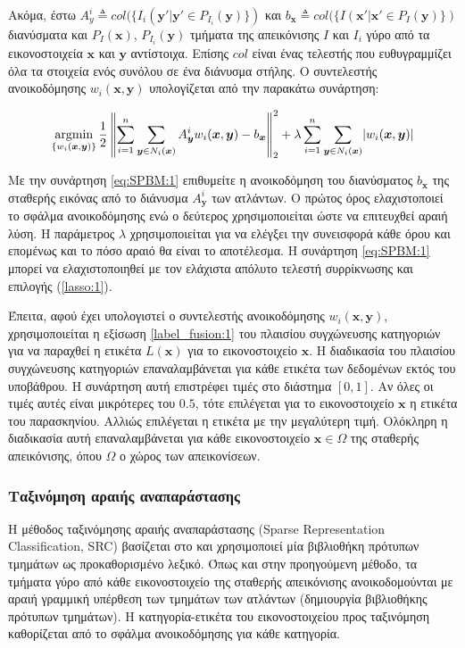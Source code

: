 \documentclass[a4paper,12pt]{article}
\newcommand{\argminB}{\mathop{\mathrm{argmin}}}
\DeclarePairedDelimiter\abs{\lvert}{\rvert}
\newcommand\norm[1]{\left\lVert#1\right\rVert}
\begin{document}
Ακόμα, έστω $A^i_y \triangleq col(\{I_i(\bm{y'} | \bm{y'} \in
P_{I_i}(\bm{y})\})$ και $b_{\bm{x}} \triangleq col( \{ I(\bm{x'} | \bm{x'} \in
P_{I}(\bm{y})\})$ διανύσματα και $P_{I}(\bm{x})$, $P_{I_i}(\bm{y})$ τμήματα της
απεικόνισης $I$ και $I_i$ γύρο από τα εικονοστοιχεία $\bm{x}$ και $\bm{y}$
αντίστοιχα. Επίσης $col$ είναι ένας τελεστής που ευθυγραμμίζει όλα τα στοιχεία
ενός συνόλου σε ένα διάνυσμα στήλης. Ο συντελεστής ανοικοδόμησης
$w_i(\bm{x},\bm{y})$ υπολογίζεται από την παρακάτω συνάρτηση:

\begin{equation} \label{eq:SPBM:1}
    \argminB_{\{w_i(\bm{x},\bm{y})\}} { \frac{1} {2} \norm {\sum_{i=1}^{n}
    \sum_{\bm{y} \in N_i(\bm{x})} A_{\bm{y}}^i w_i(\bm{x},\bm{y}) -
    b_{\bm{x}}}_2^2 }
    + \lambda \sum_{i=1}^{n} \sum_{\bm{y} \in N_i(\bm{x})}
    \abs{w_i(\bm{x},\bm{y})}
\end{equation}

Με την συνάρτηση \eqref{eq:SPBM:1} επιθυμείτε η ανοικοδόμηση του διανύσματος
$b_{\bm{x}}$ της σταθερής εικόνας από το διάνυσμα $A^i_{\bm{y}}$ των ατλάντων. Ο
πρώτος όρος ελαχιστοποιεί το σφάλμα ανοικοδόμησης ενώ ο δεύτερος χρησιμοποιείται
ώστε να επιτευχθεί αραιή λύση. Η παράμετρος $\lambda$ χρησιμοποιείται για να
ελέγξει την συνεισφορά κάθε όρου και επομένως και το πόσο αραιό θα είναι το
αποτέλεσμα. Η συνάρτηση \eqref{eq:SPBM:1} μπορεί να ελαχιστοποιηθεί με τον
ελάχιστα απόλυτο τελεστή συρρίκνωσης και επιλογής (\ref{lasso:1}).

Έπειτα, αφού έχει υπολογιστεί ο συντελεστής ανοικοδόμησης $w_i(\bm{x},\bm{y})$, 
χρησιμοποιείται η εξίσωση \eqref{label_fusion:1} του πλαισίου συγχώνευσης
κατηγοριών για να παραχθεί η ετικέτα $L(\bm{x})$ για το εικονοστοιχείο $\bm{x}$.
Η διαδικασία του πλαισίου συγχώνευσης κατηγοριών επαναλαμβάνεται για κάθε
ετικέτα των δεδομένων εκτός του υποβάθρου. Η συνάρτηση αυτή επιστρέφει τιμές στο
διάστημα $[0,1]$. Αν όλες οι τιμές αυτές είναι μικρότερες του $0.5$, τότε
επιλέγεται για το εικονοστοιχείο $\bm{x}$ η ετικέτα του παρασκηνίου. Αλλιώς
επιλέγεται η ετικέτα με την μεγαλύτερη τιμή. Ολόκληρη η διαδικασία αυτή
επαναλαμβάνεται για κάθε εικονοστοιχείο $\bm{x} \in \Omega$ της σταθερής
απεικόνισης, όπου $\Omega$ ο χώρος των απεικονίσεων.


\subsubsection{Ταξινόμηση αραιής αναπαράστασης} \label{SRC:1}

Η μέθοδος ταξινόμησης αραιής αναπαράστασης (Sparse Representation
Classification, SRC) βασίζεται στο \cite{Tong:1} και χρησιμοποιεί μία βιβλιοθήκη
πρότυπων τμημάτων ως προκαθορισμένο λεξικό. Όπως και στην προηγούμενη μέθοδο, τα
τμήματα γύρο από κάθε εικονοστοιχείο της σταθερής απεικόνισης ανοικοδομούνται με
αραιή γραμμική υπέρθεση των τμημάτων των ατλάντων (δημιουργία βιβλιοθήκης
πρότυπων τμημάτων). Η κατηγορία-ετικέτα του εικονοστοιχείου προς ταξινόμηση
καθορίζεται από το σφάλμα ανοικοδόμησης για κάθε κατηγορία.
\end{document}
